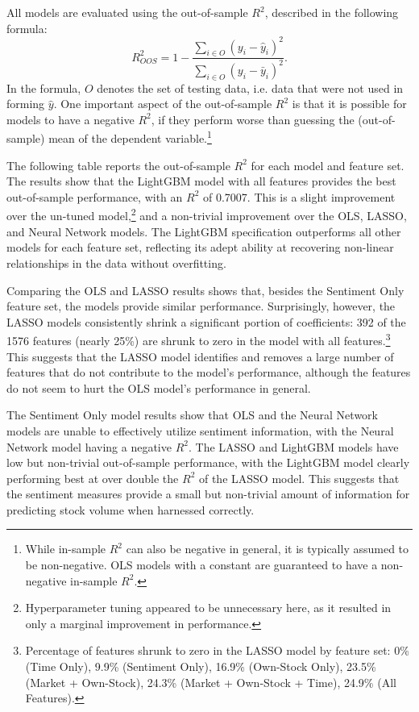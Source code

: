 \documentclass[12pt]{article}
\begin{document}
All models are evaluated using the out-of-sample $R^2$, described in the following formula:
\begin{equation}
    R^2_{OOS} = 1 - \frac{\sum_{i\in O} (y_i - \hat{y}_i)^2}{\sum_{i\in O} (y_i - \bar{y}_i)^2}.
\end{equation}
In the formula, $O$ denotes the set of testing data, i.e. data that were not used in forming $\hat{y}$. One important aspect of the out-of-sample $R^2$ is that it is possible for models to have a negative $R^2$, if they perform worse than guessing the (out-of-sample) mean of the dependent variable.\footnote{While in-sample $R^2$ can also be negative in general, it is typically assumed to be non-negative. OLS models with a constant are guaranteed to have a non-negative in-sample $R^2$.}

The following table reports the out-of-sample $R^2$ for each model and feature set. The results show that the LightGBM model with all features provides the best out-of-sample performance, with an $R^2$ of 0.7007. This is a slight improvement over the un-tuned model,\footnote{Hyperparameter tuning appeared to be unnecessary here, as it resulted in only a marginal improvement in performance.} and a non-trivial improvement over the OLS, LASSO, and Neural Network models. The LightGBM specification outperforms all other models for each feature set, reflecting its adept ability at recovering non-linear relationships in the data without overfitting.



Comparing the OLS and LASSO results shows that, besides the Sentiment Only feature set, the models provide similar performance. Surprisingly, however, the LASSO models consistently shrink a significant portion of coefficients: 392 of the 1576 features (nearly 25\%) are shrunk to zero in the model with all features.\footnote{Percentage of features shrunk to zero in the LASSO model by feature set: 0\% (Time Only), 9.9\% (Sentiment Only), 16.9\% (Own-Stock Only), 23.5\% (Market + Own-Stock), 24.3\% (Market + Own-Stock + Time), 24.9\% (All Features).} This suggests that the LASSO model identifies and removes a large number of features that do not contribute to the model's performance, although the features do not seem to hurt the OLS model's performance in general.

The Sentiment Only model results show that OLS and the Neural Network models are unable to effectively utilize sentiment information, with the Neural Network model having a negative $R^2$. The LASSO and LightGBM models have low but non-trivial out-of-sample performance, with the LightGBM model clearly performing best at over double the $R^2$ of the LASSO model. This suggests that the sentiment measures provide a small but non-trivial amount of information for predicting stock volume when harnessed correctly.
\end{document}
